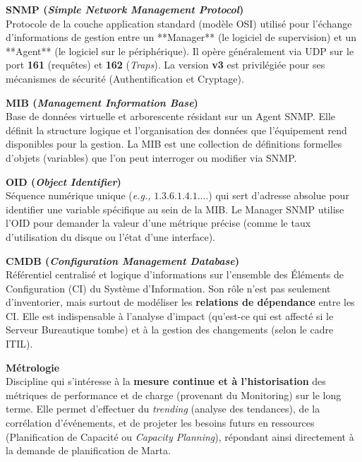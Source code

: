 \noindent \textbf{SNMP (\textit{Simple Network Management Protocol})} \\
Protocole de la couche application standard (modèle OSI) utilisé pour l'échange d'informations de gestion entre un **Manager** (le logiciel de supervision) et un **Agent** (le logiciel sur le périphérique). Il opère généralement via UDP sur le port \textbf{161} (requêtes) et \textbf{162} (\textit{Traps}). La version \textbf{v3} est privilégiée pour ses mécanismes de sécurité (Authentification et Cryptage).
\vspace{0.5em}

\noindent \textbf{MIB (\textit{Management Information Base})} \\
Base de données virtuelle et arborescente résidant sur un Agent SNMP. Elle définit la structure logique et l'organisation des données que l'équipement rend disponibles pour la gestion. La MIB est une collection de définitions formelles d'objets (variables) que l'on peut interroger ou modifier via SNMP.
\vspace{0.5em}

\noindent \textbf{OID (\textit{Object Identifier})} \\
Séquence numérique unique (\textit{e.g.,} $1.3.6.1.4.1.\dots$) qui sert d'adresse absolue pour identifier une variable spécifique au sein de la MIB. Le Manager SNMP utilise l'OID pour demander la valeur d'une métrique précise (comme le taux d'utilisation du disque ou l'état d'une interface).
\vspace{0.5em}

\noindent \textbf{CMDB (\textit{Configuration Management Database})} \\
Référentiel centralisé et logique d'informations sur l'ensemble des Éléments de Configuration (CI) du Système d'Information. Son rôle n'est pas seulement d'inventorier, mais surtout de modéliser les \textbf{relations de dépendance} entre les CI. Elle est indispensable à l'analyse d'impact (qu'est-ce qui est affecté si le Serveur Bureautique tombe) et à la gestion des changements (selon le cadre ITIL).
\vspace{0.5em}

\newpage

\noindent \textbf{Métrologie} \\
Discipline qui s'intéresse à la \textbf{mesure continue et à l'historisation} des métriques de performance et de charge (provenant du Monitoring) sur le long terme. Elle permet d'effectuer du \textit{trending} (analyse des tendances), de la corrélation d'événements, et de projeter les besoins futurs en ressources (Planification de Capacité ou \textit{Capacity Planning}), répondant ainsi directement à la demande de planification de Marta.
\vspace{0.5em}

